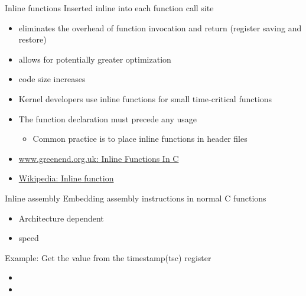 \begin{frame}
  \begin{block}{Inline functions}
    Inserted inline into each function call site
    \begin{itemize}
    \item eliminates the overhead of function invocation and return (register saving and
      restore)
    \item allows for potentially greater optimization%
    \item code size increases
    \end{itemize}
  \end{block}
  \begin{center}
  \end{center}
  \begin{itemize}
  \item Kernel developers use inline functions for small time-critical functions
  \item The function declaration must precede any usage
    \begin{itemize}
    \item Common practice is to place inline functions in header files
    \end{itemize}
  \end{itemize}
\end{frame}

\begin{itemize}
\item \href{http://www.greenend.org.uk/rjk/tech/inline.html}{www.greenend.org.uk: Inline
    Functions In C}
\item \href{http://en.wikipedia.org/wiki/Inline_function}{Wikipedia: Inline function}
\end{itemize}

\begin{frame}
  \begin{block}{Inline assembly}
    Embedding assembly instructions in normal C functions
    \begin{itemize}
    \item Architecture dependent
    \item speed
    \end{itemize}
  \end{block}
  \begin{block}{Example: Get the value from the timestamp(tsc) register}
    \begin{itemize}
    \item[] \mbox{}
    \item[] \mbox{}
    \end{itemize}
  \end{block}
\end{frame}

